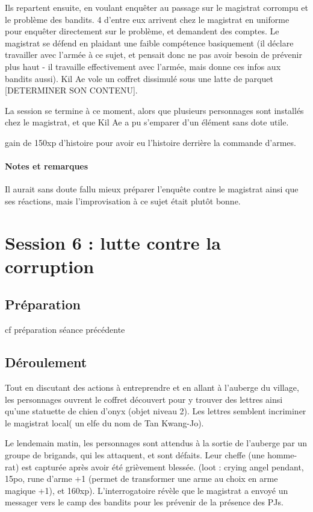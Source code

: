 \documentclass[10pt,a4paper]{book}
\begin{document}
Ils repartent ensuite, en voulant enquêter au passage sur le magistrat corrompu et le problème des bandits. 4 d'entre eux arrivent chez le magistrat en uniforme pour enquêter directement sur le problème, et demandent des comptes. Le magistrat se défend en plaidant une faible compétence basiquement (il déclare travailler avec l'armée à ce sujet, et pensait donc ne pas avoir besoin de prévenir plus haut - il travaille effectivement avec l'armée, mais donne ces infos aux bandits aussi). Kil Ae vole un coffret dissimulé sous une latte de parquet [DETERMINER SON CONTENU]. 

La session se termine à ce moment, alors que plusieurs personnages sont installés chez le magistrat, et que Kil Ae a pu s'emparer d'un élément sans dote utile.

gain de 150xp d'histoire pour avoir eu l'histoire derrière la commande d'armes.
\paragraph{Notes et remarques}
Il aurait sans doute fallu mieux préparer l'enquête contre le magistrat ainsi que ses réactions, mais l'improvisation à ce sujet était plutôt bonne.
\section{Session 6 : lutte contre la corruption}
\subsection{Préparation} cf préparation séance précédente
\subsection{Déroulement}
Tout en discutant des actions à entreprendre et en allant à l'auberge du village, les personnages ouvrent le coffret découvert pour y trouver des lettres ainsi qu'une statuette de chien d'onyx (objet niveau 2). Les lettres semblent incriminer le magistrat local( un elfe du nom de Tan Kwang-Jo).

Le lendemain matin, les personnages sont attendus à la sortie de l'auberge par un groupe de brigands, qui les attaquent, et sont défaits. Leur cheffe (une homme-rat) est capturée après avoir été grièvement blessée. (loot : crying angel pendant, 15po, rune d'arme +1 (permet de transformer une arme au choix en arme magique +1), et 160xp). L'interrogatoire révèle que le magistrat a envoyé un messager vers le camp des bandits pour les prévenir de la présence des PJs.
\end{document}
